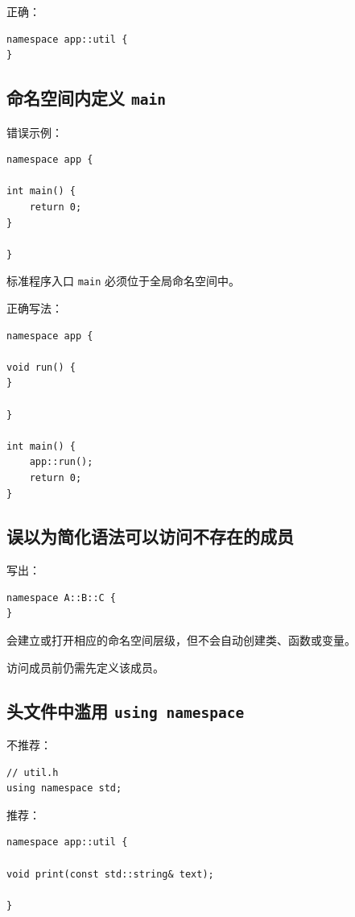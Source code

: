 \documentclass[UTF8,12pt,a4paper]{ctexart}
\begin{document}
正确：

\begin{lstlisting}
namespace app::util {
}
\end{lstlisting}

\subsection{命名空间内定义 \texttt{main}}

错误示例：

\begin{lstlisting}
namespace app {

int main() {
    return 0;
}

}
\end{lstlisting}

标准程序入口 \texttt{main} 必须位于全局命名空间中。

正确写法：

\begin{lstlisting}
namespace app {

void run() {
}

}

int main() {
    app::run();
    return 0;
}
\end{lstlisting}

\subsection{误以为简化语法可以访问不存在的成员}

写出：

\begin{lstlisting}
namespace A::B::C {
}
\end{lstlisting}

会建立或打开相应的命名空间层级，但不会自动创建类、函数或变量。

访问成员前仍需先定义该成员。

\subsection{头文件中滥用 \texttt{using namespace}}

不推荐：

\begin{lstlisting}
// util.h
using namespace std;
\end{lstlisting}

推荐：

\begin{lstlisting}
namespace app::util {

void print(const std::string& text);

}
\end{lstlisting}
\end{document}
